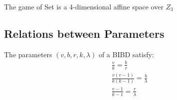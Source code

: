 \begin{example}
    The game of Set is a 4-dimensional affine space over $Z_3$
\end{example}

\subsection{Relations between Parameters}
\begin{theorem}
    The parameters $(v, b, r, k, \lambda)$ of a BIBD satisfy:
    \begin{align}
        \frac{v}{k} = \frac{b}{r} \\
        \frac{v(v-1)}{k(k-1)} = \frac{b}{\lambda} \\
        \frac{v-1}{k-1} = \frac{r}{\lambda}
    \end{align}
\end{theorem}
